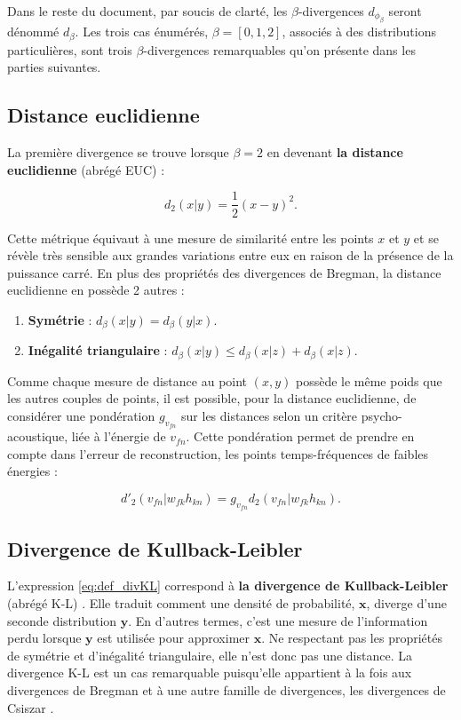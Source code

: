 Dans le reste du document, par soucis de clarté, les $\beta$-divergences $d_{\phi_{\beta}}$ seront dénommé $d_{\beta}$. Les trois cas énumérés, $\beta  = [0,1,2]$, associés à des distributions particulières, sont trois $\beta$-divergences remarquables qu'on présente dans les parties suivantes.

\subsection{Distance euclidienne}
La première divergence se trouve lorsque $\beta = 2$ en devenant \textbf{la distance euclidienne} (abrégé EUC) :

\begin{equation}
d_{{2}}(x\vert y) = \dfrac{1}{2}(x-y)^2.
\end{equation}

Cette métrique équivaut à une mesure de similarité entre les points $x$ et $y$ et se révèle très sensible aux grandes variations entre eux en raison de la présence de la puissance carré. En plus des propriétés des divergences de Bregman, la distance euclidienne en possède 2 autres :
\begin{enumerate}

\item \textbf{Symétrie} : $d_{\beta}(x \vert y ) = d_{\beta}(y \vert x)$.

\item \textbf{Inégalité triangulaire} : $d_{\beta}(x \vert y ) \leq d_{\beta}(x \vert z ) + d_{\beta}(x \vert z )$.\\
\end{enumerate}

Comme chaque mesure de distance au point $(x,y)$ possède le même poids que les autres couples de points, il est possible, pour la distance euclidienne, de considérer une pondération $g_{v_{fn}}$  sur les distances selon un critère psycho-acoustique, liée à l'énergie de $v_{fn}$. Cette pondération permet de prendre en compte dans l'erreur de reconstruction, les points temps-fréquences de faibles énergies \cite{virtanen2004separation} :

\begin{equation}
d'_2(v_{fn} \vert w_{fk} h_{kn}) = g_{v_{fn}} d_2 (v_{fn} \vert w_{fk} h_{kn}).
\end{equation}

\subsection{Divergence de Kullback-Leibler}
L'expression \ref{eq:def_divKL} correspond à \textbf{la divergence de Kullback-Leibler} (abrégé K-L) \cite{kompass_generalized_2007, cichocki_new_2006} . Elle traduit comment une densité de probabilité, $\mathbf{x}$, diverge d'une seconde distribution $\mathbf{y}$. En d'autres termes, c'est une mesure de l'information perdu lorsque $\mathbf{y}$ est utilisée pour approximer $\mathbf{x}$. Ne respectant pas les propriétés de symétrie et d'inégalité triangulaire, elle n'est donc pas une distance. La divergence K-L est un cas remarquable puisqu'elle appartient à la fois aux divergences de Bregman et à une autre famille de divergences, les divergences de Csiszar \cite{cichocki_csiszars_2006}.

